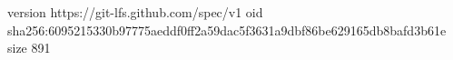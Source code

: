 version https://git-lfs.github.com/spec/v1
oid sha256:6095215330b97775aeddf0ff2a59dac5f3631a9dbf86be629165db8bafd3b61e
size 891
